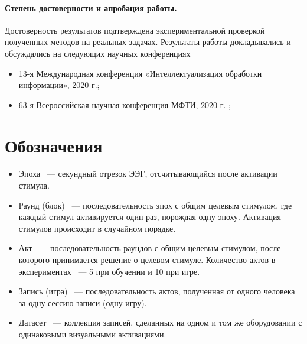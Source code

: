 \documentclass[12pt]{article}
\begin{document}
	
	\paragraph{Степень достоверности и апробация работы.}
	Достоверность результатов подтверждена экспериментальной проверкой полученных методов на реальных задачах.
	Результаты работы докладывались и обсуждались на следующих научных конференциях
	\begin{itemize}
		\item 13-я Международная конференция «Интеллектуализация обработки информации», 2020 г.\cite{IDP2020};
		\item 63-я Всероссийская научная конференция МФТИ, 2020 г. \cite{mipt2020};
	\end{itemize}
	
	
	
	
	
	
	
	
	\newpage
	\section*{Обозначения}
	
	\begin{itemize}
		\item Эпоха ~--- секундный отрезок ЭЭГ, отсчитывающийся после активации стимула.
		\item Раунд (блок) ~--- последовательность эпох с общим целевым стимулом, где каждый стимул активируется один раз, порождая одну эпоху. Активация стимулов происходит в случайном порядке.
		
		\item Акт ~--- последовательность раундов с общим целевым стимулом, после которого принимается решение о целевом стимуле. Количество актов в экспериментах ~--- 5 при обучении и 10 при игре.
		
		\item Запись (игра) ~--- последовательность актов, полученная от одного человека за одну сессию записи (одну игру).
		
		\item Датасет ~--- коллекция записей, сделанных на одном и том же оборудовании с одинаковыми визуальными активациями.
	\end{itemize}
	
\end{document}
